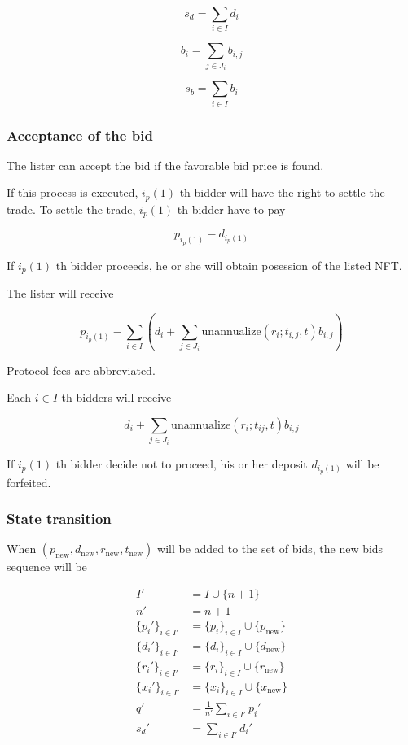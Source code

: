 \documentclass[dvipdfmx]{jsarticle}
\begin{document}
$$
  s_d = \sum_{i \in I} d_i
$$

$$
  b_i = \sum_{j \in J_i} b_{i,j}
$$

$$
  s_b = \sum_{i \in I} b_i
$$

\subsubsection{Acceptance of the bid}

The lister can accept the bid if the favorable bid price is found.

If this process is executed, $i_p(1)$ th bidder will have the right to settle the trade.
To settle the trade, $i_p(1)$ th bidder have to pay

$$
  p_{i_p(1)} - d_{i_p(1)}
$$

If $i_p(1)$ th bidder proceeds, he or she will obtain posession of the listed NFT.

The lister will receive

$$
  p_{i_p(1)} - \sum_{i \in I} \left( d_i + \sum_{j \in J_i} \text{unannualize}(r_i; t_{i,j}, t) b_{i,j} \right)
$$

Protocol fees are abbreviated.

Each $i \in I$ th bidders will receive

$$
  d_i + \sum_{j \in J_i} \text{unannualize}(r_i; t_{ij}, t) b_{i,j}
$$

If $i_p(1)$ th bidder decide not to proceed, his or her deposit $d_{i_p(1)}$ will be forfeited.

\subsubsection{State transition}

When $(p_{\text{new}}, d_{\text{new}}, r_{\text{new}}, t_{\text{new}})$ will be added to the set of bids, the new bids sequence will be

$$
\begin{aligned}
  I' &= I \cup \{n+1\} \\
  n' &= n + 1 \\
  \{p_i'\}_{i \in I'} &= \{p_i\}_{i \in I} \cup \{p_{\text{new}}\} \\
  \{d_i'\}_{i \in I'} &= \{d_i\}_{i \in I} \cup \{d_{\text{new}}\} \\
  \{r_i'\}_{i \in I'} &= \{r_i\}_{i \in I} \cup \{r_{\text{new}}\} \\
  \{x_i'\}_{i \in I'} &= \{x_i\}_{i \in I} \cup \{x_{\text{new}}\} \\
  q' &= \frac{1}{n'} \sum_{i \in I'} p_i' \\
  s_d' &= \sum_{i \in I'} d_i'
\end{aligned}
$$
\end{document}
